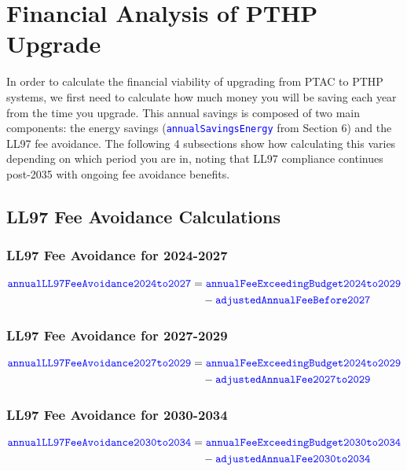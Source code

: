 \documentclass{article}
\newcommand{\code}[1]{\textcolor{blue}{\texttt{#1}}}
\begin{document}
\section{Financial Analysis of PTHP Upgrade}

In order to calculate the financial viability of upgrading from PTAC to PTHP systems, we first need to calculate how much money you will be saving each year from the time you upgrade. This annual savings is composed of two main components: the energy savings (\code{annualSavingsEnergy} from Section 6) and the LL97 fee avoidance. The following 4 subsections show how calculating this varies depending on which period you are in, noting that LL97 compliance continues post-2035 with ongoing fee avoidance benefits.

\subsection{LL97 Fee Avoidance Calculations}

\subsubsection{LL97 Fee Avoidance for 2024-2027}

\begin{align}
\code{annualLL97FeeAvoidance2024to2027} &= \code{annualFeeExceedingBudget2024to2029} \nonumber\\
&\quad - \code{adjustedAnnualFeeBefore2027}
\end{align}

\subsubsection{LL97 Fee Avoidance for 2027-2029}

\begin{align}
\code{annualLL97FeeAvoidance2027to2029} &= \code{annualFeeExceedingBudget2024to2029} \nonumber \\
&\quad - \code{adjustedAnnualFee2027to2029}
\end{align}

\subsubsection{LL97 Fee Avoidance for 2030-2034}

\begin{align}
\code{annualLL97FeeAvoidance2030to2034} &= \code{annualFeeExceedingBudget2030to2034} \nonumber \\
&\quad - \code{adjustedAnnualFee2030to2034}
\end{align}
\end{document}
